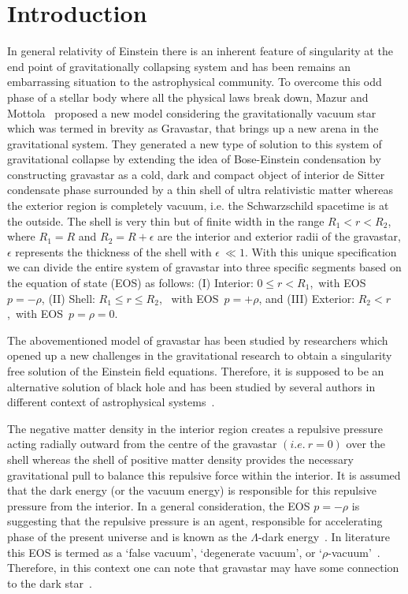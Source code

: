 \documentclass[preprint,12pt]{elsarticle}
\begin{document}
\section{Introduction}
In general relativity of Einstein there is an inherent feature of singularity
at the end point of gravitationally collapsing system and has been remains an embarrassing
situation to the astrophysical community. To overcome this odd phase of a stellar body
where all the physical laws break down, Mazur and Mottola~\cite{Mazur2001,Mazur2004}
proposed a new model considering the gravitationally vacuum star which was termed
in brevity as Gravastar, that brings up a new arena in the gravitational system.
They generated a new type of solution to this system of gravitational
collapse by extending the idea of Bose-Einstein condensation by constructing
gravastar as a cold, dark and compact object of interior
de Sitter condensate phase surrounded by a thin shell of ultra relativistic
matter whereas the exterior region is completely vacuum, i.e. the Schwarzschild
spacetime is at the outside. The shell is very thin but of finite width in the range
$ R_1 < r < R_2 $, where $R_1=R$ and $R_2=R+\epsilon$ are the interior and exterior
radii of the gravastar, $\epsilon$ represents the thickness of the shell with $\epsilon \ \ll1$.
With this unique specification we can divide the entire system of gravastar
into three specific segments based on the equation of state (EOS) as follows:
(I) Interior: $0 \leq r < R_1 $,~with EOS~$ p = -\rho $, (II) Shell: $ R_1 \leq r \leq R_2 $,
~with EOS~$ p = +\rho $, and (III) Exterior: $ R_2 < r $,~with EOS~$ p = \rho =0$.

The abovementioned model of gravastar has been studied by researchers
which opened up a new challenges in the gravitational research to obtain
a singularity free solution of the Einstein field equations.  Therefore, it is
supposed to be an alternative solution of black hole and has been studied by
several authors in different context of astrophysical systems~\cite{Visser2004,
Cattoen2005,Carter2005,Bilic2006,Lobo2006,DeBenedictis2006,
Lobo2007,Horvat2007,Cecilia2007,Rocha2008,Horvat2008,Nandi2009,
Turimov2009,Usmani2011,Rahaman2012a,Rahaman2012b,Rahaman2012c,Ghosh2017}.

The negative matter density in the interior region creates
a repulsive pressure acting radially outward from the centre of the
gravastar $(i.e.~r=0)$ over the shell whereas the shell of positive
matter density provides the necessary gravitational pull to
balance this repulsive force within the interior. It is assumed that
the dark energy (or the vacuum energy) is responsible for this repulsive
pressure from the interior. In a general consideration, the EOS $ p = -\rho $
is suggesting that the repulsive pressure is an agent,
responsible for accelerating  phase of the present universe and is known as the $\Lambda$-dark
energy~\cite{Riess1998,Perlmutter1999,Ray2007b,Usmani2008,Frieman2008}. In literature this
EOS is termed as a `false vacuum', `degenerate vacuum', or `$\rho$-vacuum'~\cite{Davies1984,Blome1984,Hogan1984,Kaiser1984}.
 Therefore, in this context one can note that gravastar may have some connection to the dark
star~\cite{Lobo2008,Chan2009a,Chan2009b,Usmani2011}.
\end{document}
